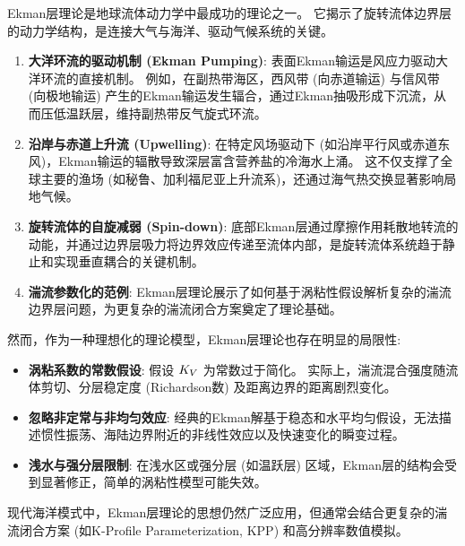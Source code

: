 \begin{insightbox}[Ekman层的物理和气候意义]
    Ekman层理论是地球流体动力学中最成功的理论之一。
    它揭示了旋转流体边界层的动力学结构，是连接大气与海洋、驱动气候系统的关键。
    \begin{enumerate}
        \item \textbf{大洋环流的驱动机制 (Ekman Pumping)}: 表面Ekman输运是风应力驱动大洋环流的直接机制。
        例如，在副热带海区，西风带 (向赤道输运) 与信风带 (向极地输运) 产生的Ekman输运发生辐合，通过Ekman抽吸形成下沉流，从而压低温跃层，维持副热带反气旋式环流。
        \item \textbf{沿岸与赤道上升流 (Upwelling)}: 在特定风场驱动下 (如沿岸平行风或赤道东风)，Ekman输运的辐散导致深层富含营养盐的冷海水上涌。
        这不仅支撑了全球主要的渔场 (如秘鲁、加利福尼亚上升流系)，还通过海气热交换显著影响局地气候。
        \item \textbf{旋转流体的自旋减弱 (Spin-down)}: 底部Ekman层通过摩擦作用耗散地转流的动能，并通过边界层吸力将边界效应传递至流体内部，是旋转流体系统趋于静止和实现垂直耦合的关键机制。
        \item \textbf{湍流参数化的范例}: Ekman层理论展示了如何基于涡粘性假设解析复杂的湍流边界层问题，为更复杂的湍流闭合方案奠定了理论基础。
    \end{enumerate}

    然而，作为一种理想化的理论模型，Ekman层理论也存在明显的局限性:
    \begin{itemize}
        \item \textbf{涡粘系数的常数假设}: 假设 $K_V$ 为常数过于简化。
        实际上，湍流混合强度随流体剪切、分层稳定度 (Richardson数) 及距离边界的距离剧烈变化。
        \item \textbf{忽略非定常与非均匀效应}: 经典的Ekman解基于稳态和水平均匀假设，无法描述惯性振荡、海陆边界附近的非线性效应以及快速变化的瞬变过程。
        \item \textbf{浅水与强分层限制}: 在浅水区或强分层 (如温跃层) 区域，Ekman层的结构会受到显著修正，简单的涡粘性模型可能失效。
    \end{itemize}

    现代海洋模式中，Ekman层理论的思想仍然广泛应用，但通常会结合更复杂的湍流闭合方案 (如K-Profile Parameterization, KPP) 和高分辨率数值模拟。
\end{insightbox}
